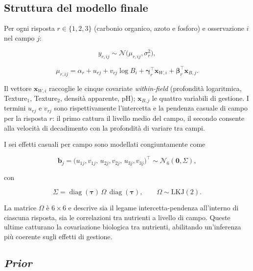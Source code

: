 \documentclass[11pt, a4paper]{article}
\begin{document}
\subsection{Struttura del modello finale}
\label{subsec:msp}

Per ogni risposta $r \in \{1,2,3\}$ (carbonio organico, azoto e fosforo) e osservazione $i$ nel campo $j$:

\[
  y_{r,ij} \sim \mathcal{N}\!\bigl(\mu_{r,ij},\sigma_r^2\bigr),
\]

\[
  \mu_{r,ij}
  = \alpha_r
  + u_{rj}
  + v_{rj}\log B_i
  + \boldsymbol{\gamma}_r^\top \mathbf{x}_{W,i}
  + \boldsymbol{\beta}_r^\top \mathbf{x}_{B,j}.
\]

Il vettore $\mathbf{x}_{W,i}$ raccoglie le cinque covariate \textit{within-field} (profondità logaritmica, Texture$_1$, Texture$_2$, densità apparente, pH); $\mathbf{x}_{B,j}$ le quattro variabili di gestione. I termini $u_{rj}$ e $v_{rj}$ sono rispettivamente l'intercetta e la pendenza casuale di campo per la risposta $r$: il primo cattura il livello medio del campo, il secondo consente alla velocità di decadimento con la profondità di variare tra campi.

I sei effetti casuali per campo sono modellati congiuntamente come

\[
  \mathbf{b}_j
  =
  \bigl(u_{1j},v_{1j},\,u_{2j},v_{2j},\,u_{3j},v_{3j}\bigr)^\top
  \sim
  \mathcal{N}_6(\mathbf{0},\Sigma),
\]

con

\[
  \Sigma
  =
  \operatorname{diag}(\boldsymbol{\tau})
  \,\Omega\,
  \operatorname{diag}(\boldsymbol{\tau}),
  \qquad
  \Omega \sim \mathrm{LKJ}(2).
\]

La matrice $\Omega$ è $6\times6$ e descrive sia il legame intercetta-pendenza all'interno di ciascuna risposta, sia le correlazioni tra nutrienti a livello di campo. Queste ultime catturano la covariazione biologica tra nutrienti, abilitando un'inferenza più coerente sugli effetti di gestione.

\subsection{\textit{Prior}}
\label{subsec:prior}
\end{document}
